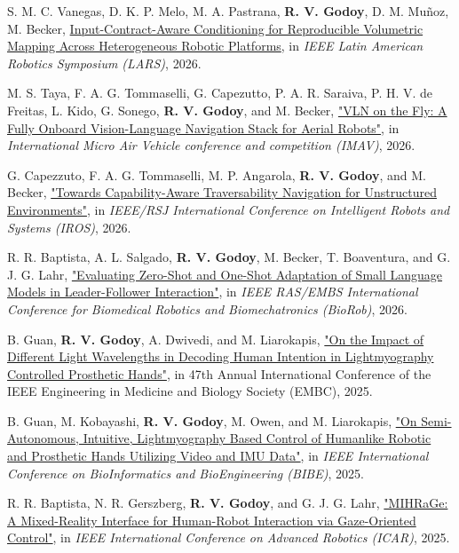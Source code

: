 \begin{cvparagraph}
S. M. C. Vanegas, D. K. P. Melo, M. A. Pastrana, \textbf{R. V. Godoy}, D. M. Muñoz, M. Becker, \href{https://www.ricardovgodoy.com/publication/2026-input-contract-aware-mapping}{Input-Contract-Aware Conditioning for Reproducible Volumetric Mapping Across Heterogeneous Robotic Platforms}, in \textit{IEEE Latin American Robotics Symposium (LARS)}, 2026. 

M. S. Taya, F. A. G. Tommaselli, G. Capezutto, P. A. R. Saraiva,
P. H. V. de Freitas, L. Kido, G. Sonego, \textbf{R. V. Godoy}, and M. Becker, \href{https://www.researchgate.net/publication/412189747_VLN_on_the_Fly_An_Onboard_Vision-Language_Navigation_Stack_for_Aerial_Robots}{"VLN on the Fly: A Fully Onboard Vision-Language Navigation Stack for Aerial Robots"},  in \textit{International Micro Air Vehicle conference and competition (IMAV)}, 2026.


G. Capezzuto, F. A. G. Tommaselli, M. P. Angarola, \textbf{R. V. Godoy}, and M. Becker, \href{https://capability-aware-traversability.github.io}{"Towards Capability-Aware Traversability Navigation for Unstructured Environments"}, in \textit{IEEE/RSJ International Conference on Intelligent Robots and Systems (IROS)}, 2026.

R. R. Baptista, A. L. Salgado, \textbf{R. V. Godoy}, M. Becker, T. Boaventura, and G. J. G. Lahr, \href{https://arxiv.org/abs/2602.23312}{"Evaluating Zero-Shot and One-Shot Adaptation of Small Language Models in Leader-Follower Interaction"}, in \textit{IEEE RAS/EMBS International Conference for Biomedical Robotics and Biomechatronics (BioRob)}, 2026.

B. Guan, \textbf{R. V. Godoy}, A. Dwivedi, and M. Liarokapis, \href{https://ieeexplore.ieee.org/document/11252975}{"On the Impact of Different Light Wavelengths in Decoding Human Intention in Lightmyography Controlled Prosthetic Hands"}, in 47th Annual International Conference of the IEEE Engineering in Medicine and Biology Society (EMBC), 2025.

B. Guan, M. Kobayashi, \textbf{R. V. Godoy}, M. Owen, and M. Liarokapis, \href{https://ieeexplore.ieee.org/document/11273511}{"On Semi-Autonomous, Intuitive, Lightmyography Based Control of Humanlike Robotic and Prosthetic Hands Utilizing Video and IMU Data"}, in \textit{IEEE International Conference on BioInformatics and BioEngineering (BIBE)}, 2025.

R. R. Baptista, N. R. Gerszberg, \textbf{R. V. Godoy}, and G. J. G. Lahr, \href{https://arxiv.org/abs/2505.03929}{"MIHRaGe: A Mixed-Reality Interface for Human-Robot Interaction via Gaze-Oriented Control"}, in \textit{IEEE International Conference on Advanced Robotics (ICAR)}, 2025.


\end{cvparagraph}
